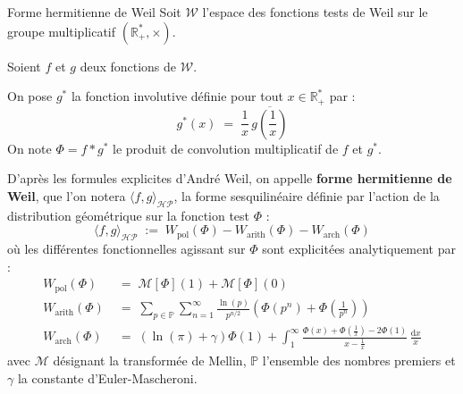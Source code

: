 \documentclass[Riemann_Hypothesis.tex]{subfiles}
\begin{document}
\begin{DefNef}[label=df:FormeHermitienneWeil_fr]{Forme hermitienne de Weil}
    Soit $\mathcal{W}$ l'espace des fonctions tests de Weil sur le groupe 
    multiplicatif $\left(\mathbb{R}_+^*, \times\right)$. \par
    Soient $f$ et $g$ deux fonctions de $\mathcal{W}$. \par
    On pose $g^*$ la fonction involutive définie pour tout $x \in \mathbb{R}_+^*$ par :
    \begin{equation*}
        g^*(x) \;=\; \frac{1}{x} \, \overline{g\left(\frac{1}{x}\right)}
    \end{equation*}
    On note $\Phi = f * g^*$ le produit de convolution multiplicatif de $f$ et $g^*$. \par
    D'après les formules explicites d'André Weil, on appelle 
    \textbf{forme hermitienne de Weil}, que l'on notera $\langle f, g \rangle_{\mathcal{HP}}$, la forme sesquilinéaire définie par l'action de la distribution géométrique sur la fonction test $\Phi$ :
    \begin{equation*}
        \langle f, g \rangle_{\mathcal{HP}} \;:=\; W_{\text{pol}}(\Phi) - W_{\text{arith}}(\Phi) - W_{\text{arch}}(\Phi)
    \end{equation*}
    où les différentes fonctionnelles agissant sur $\Phi$ sont explicitées analytiquement par :
    \begin{align*}
        W_{\text{pol}}(\Phi) \;&=\; \mathcal{M}[\Phi](1) + \mathcal{M}[\Phi](0) \\
        W_{\text{arith}}(\Phi) \;&=\; \sum_{p \in \mathbb{P}} \sum_{n=1}^{\infty} \frac{\ln(p)}{p^{n/2}} \left( \Phi(p^n) + \Phi\left(\frac{1}{p^n}\right) \right) \\
        W_{\text{arch}}(\Phi) \;&=\; \left( \ln(\pi) + \gamma \right) \Phi(1) + \int_{1}^{\infty} \frac{\Phi(x) + \Phi\left(\frac{1}{x}\right) - 2\Phi(1)}{x - \frac{1}{x}} \, \frac{\mathrm{d}x}{x}
    \end{align*}
    avec $\mathcal{M}$ désignant la transformée de Mellin, $\mathbb{P}$ l'ensemble des nombres premiers et $\gamma$ la constante d'Euler-Mascheroni.
\end{DefNef}
\end{document}
